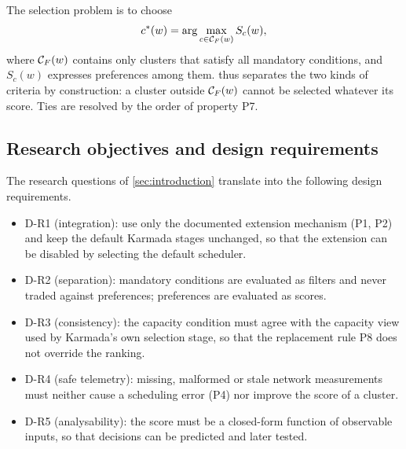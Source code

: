 The selection problem is to choose
\begin{equation}\label{eq:selection}
c^{*}(w) = \arg\max_{c \in \mathcal{C}_{F}(w)} S_c(w),
\end{equation}
where $\mathcal{C}_{F}(w)$ contains only clusters that satisfy all mandatory conditions, and $S_c(w)$ expresses preferences among them.  thus separates the two kinds of criteria by construction: a cluster outside $\mathcal{C}_{F}(w)$ cannot be selected whatever its score. Ties are resolved by the order of property P7.

\subsection{Research objectives and design requirements}\label{sec:requirements}

The research questions of \cref{sec:introduction} translate into the following design requirements.
\begin{itemize}
  \item D-R1 (integration): use only the documented extension mechanism (P1, P2) and keep the default Karmada stages unchanged, so that the extension can be disabled by selecting the default scheduler.
  \item D-R2 (separation): mandatory conditions are evaluated as filters and never traded against preferences; preferences are evaluated as scores.
  \item D-R3 (consistency): the capacity condition must agree with the capacity view used by Karmada's own selection stage, so that the replacement rule P8 does not override the ranking.
  \item D-R4 (safe telemetry): missing, malformed or stale network measurements must neither cause a scheduling error (P4) nor improve the score of a cluster.
  \item D-R5 (analysability): the score must be a closed-form function of observable inputs, so that decisions can be predicted and later tested.
\end{itemize}
